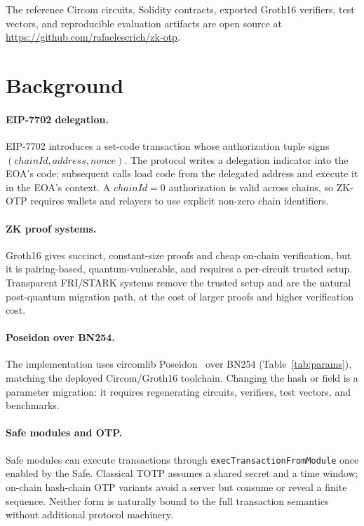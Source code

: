 \documentclass[11pt]{article}
\theoremstyle{definition}
\theoremstyle{plain}
\begin{document}
The reference Circom circuits, Solidity contracts, exported Groth16 verifiers,
test vectors, and reproducible evaluation artifacts are open source at
\url{https://github.com/rafaelescrich/zk-otp}.

\section{Background}
\label{sec:background}

\paragraph{EIP-7702 delegation.} EIP-7702 introduces a set-code transaction whose
authorization tuple signs $(\mathit{chainId}, \mathit{address}, \mathit{nonce})$.
The protocol writes a delegation indicator into the EOA's code; subsequent calls
load code from the delegated address and execute it in the EOA's context. A
$\mathit{chainId}=0$ authorization is valid across chains, so ZK-OTP requires
wallets and relayers to use explicit non-zero chain identifiers.

\paragraph{ZK proof systems.} Groth16 gives succinct, constant-size proofs and
cheap on-chain verification, but it is pairing-based, quantum-vulnerable, and
requires a per-circuit trusted setup. Transparent FRI/STARK systems remove the
trusted setup and are the natural post-quantum migration path, at the cost of
larger proofs and higher verification cost.

\paragraph{Poseidon over BN254.} The implementation uses circomlib Poseidon~\cite{poseidon} over
BN254 (Table~\ref{tab:params}), matching the deployed Circom/Groth16 toolchain.
Changing the hash or field is a parameter migration: it requires regenerating
circuits, verifiers, test vectors, and benchmarks.

\paragraph{Safe modules and OTP.} Safe modules can execute transactions through
\texttt{execTransactionFromModule} once enabled by the Safe. Classical TOTP
assumes a shared secret and a time window; on-chain hash-chain OTP variants avoid
a server but consume or reveal a finite sequence. Neither form is naturally bound
to the full transaction semantics without additional protocol machinery.
\end{document}
